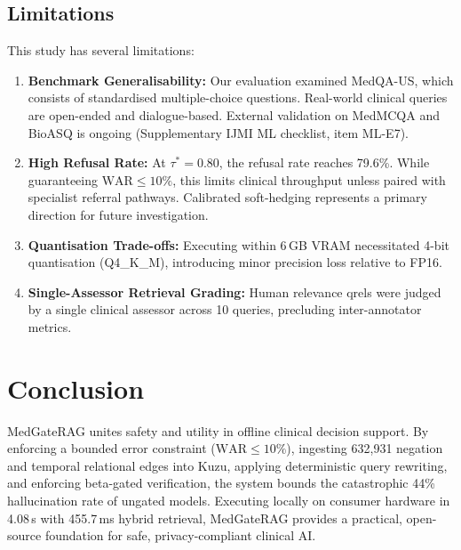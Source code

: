 \documentclass[preprint,12pt,a4paper]{elsarticle}
\begin{document}
\subsection{Limitations}
\label{sec:limits}

This study has several limitations:
\begin{enumerate}
  \item \textbf{Benchmark Generalisability:} Our evaluation examined MedQA-US, which consists of
        standardised multiple-choice questions. Real-world clinical queries are open-ended
        and dialogue-based. External validation on MedMCQA and BioASQ is ongoing
        (Supplementary IJMI ML checklist, item ML-E7).
  \item \textbf{High Refusal Rate:} At $\tau^*=0.80$, the refusal rate reaches 79.6\%.
        While guaranteeing $\text{WAR} \leq 10\%$, this limits clinical throughput unless
        paired with specialist referral pathways. Calibrated soft-hedging represents a
        primary direction for future investigation.
  \item \textbf{Quantisation Trade-offs:} Executing within 6\,GB VRAM necessitated 4-bit
        quantisation (Q4\_K\_M), introducing minor precision loss relative to FP16.
  \item \textbf{Single-Assessor Retrieval Grading:} Human relevance qrels were judged by a
        single clinical assessor across 10 queries, precluding inter-annotator metrics.
\end{enumerate}

\section{Conclusion}
\label{sec:conclusion}

MedGateRAG unites safety and utility in offline clinical decision support. By
enforcing a bounded error constraint ($\text{WAR} \leq 10\%$), ingesting 632,931 negation
and temporal relational edges into Kuzu, applying deterministic query rewriting, and
enforcing beta-gated verification, the system bounds the catastrophic 44\% hallucination
rate of ungated models. Executing locally on consumer hardware in 4.08\,s with 455.7\,ms
hybrid retrieval, MedGateRAG provides a practical, open-source foundation for safe,
privacy-compliant clinical AI.

\FloatBarrier
\end{document}

